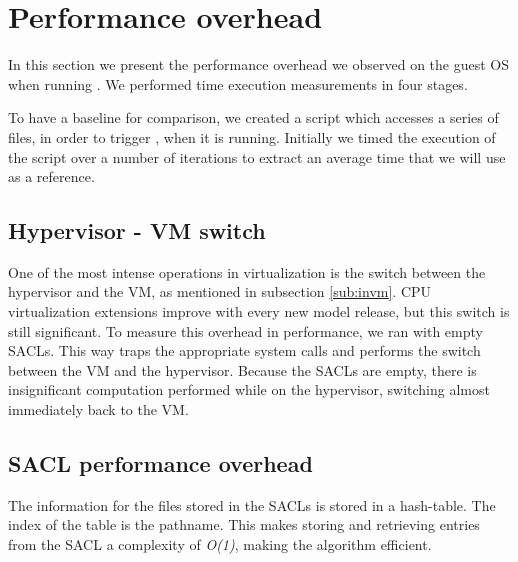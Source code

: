 \section{Performance overhead}\label{sec:performance}

In this section we present the performance overhead we observed on the guest \ac{OS} when running . We performed time execution measurements in four stages. 

\par To have a baseline for comparison, we created a script which accesses a series of files, in order to trigger , when it is running. Initially we timed the execution of the script over a number of iterations to extract an average time that we will use as a reference. 

\subsection{Hypervisor - \ac{VM} switch}

\par One of the most intense operations in virtualization is the switch between the hypervisor and the \ac{VM}, as mentioned in subsection \ref{sub:invm}. \ac{CPU} virtualization extensions improve with every new model release, but this switch is still significant. To measure this overhead in performance, we ran  with empty \acp{SACL}. This way  traps the appropriate system calls and performs the switch between the \ac{VM} and the hypervisor. Because the \acp{SACL} are empty, there is insignificant computation performed while on the hypervisor, switching almost immediately back to the \ac{VM}. 


\subsection{\ac{SACL} performance overhead}

\par The information for the files stored in the \acp{SACL} is stored in a hash-table. The index of the table is the pathname. This makes storing and retrieving entries from the \ac{SACL} a complexity of \emph{O(1)}, making the algorithm efficient.

